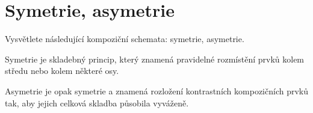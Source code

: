 \section{Symetrie, asymetrie}
Vysvětlete následující kompoziční schemata: symetrie, asymetrie.

Symetrie je skladebný princip, který znamená pravidelné rozmístění prvků kolem středu nebo kolem některé osy.

Asymetrie je opak symetrie a znamená rozložení kontrastních kompozičních prvků tak, aby jejich celková skladba působila 
vyváženě.